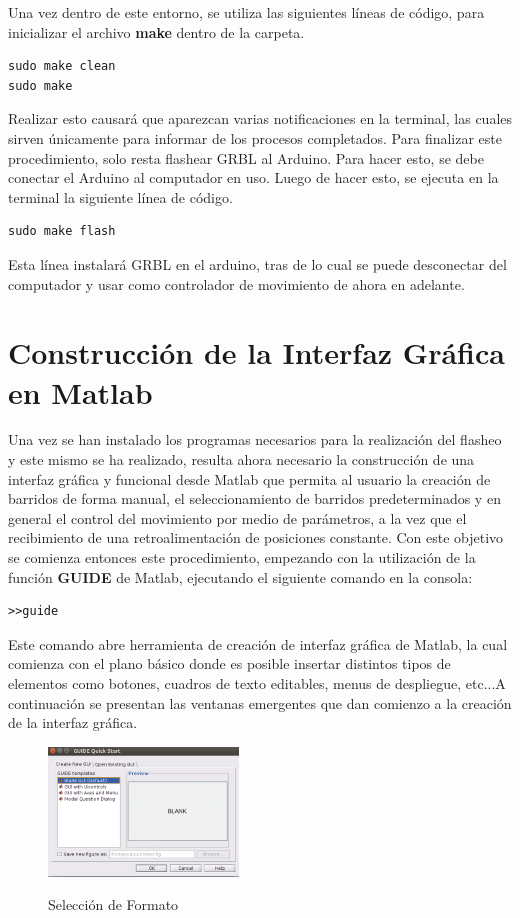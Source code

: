 \documentclass{article}
\begin{document}
\begin{multicols}{2}
\begin{enumerate}
Una vez dentro de este entorno, se utiliza las siguientes líneas de código, para inicializar el archivo \textbf{make} dentro de la carpeta.
\begin{lstlisting}
sudo make clean
sudo make
\end{lstlisting}
Realizar esto causará que aparezcan varias notificaciones en la terminal, las cuales sirven únicamente para informar de los procesos completados. Para finalizar este procedimiento, solo resta flashear GRBL al Arduino. Para hacer esto, se debe conectar el Arduino al computador en uso. Luego de hacer esto, se ejecuta en la terminal la siguiente línea de código.
\begin{lstlisting}
sudo make flash
\end{lstlisting}
Esta línea instalará GRBL en el arduino, tras de lo cual se puede desconectar del computador y usar como controlador de movimiento de ahora en adelante.
\end{enumerate}
{\centering \section{Construcción de la Interfaz Gráfica en Matlab}}
Una vez se han instalado los programas necesarios para la realización del flasheo y este mismo se ha realizado, resulta ahora necesario la construcción de una interfaz gráfica y funcional desde Matlab que permita al usuario la creación de barridos de forma manual, el seleccionamiento de barridos predeterminados y en general el control del movimiento por medio de parámetros, a la vez que el recibimiento de una retroalimentación de posiciones constante. Con este objetivo se comienza entonces este procedimiento, empezando con la utilización de la función \textbf{GUIDE} de Matlab, ejecutando el siguiente comando en la consola:
\begin{lstlisting}
>>guide
\end{lstlisting}
Este comando abre herramienta de creación de interfaz gráfica de Matlab, la cual comienza con el plano básico donde es posible insertar distintos tipos de elementos como botones, cuadros de texto editables, menus de despliegue, etc...A continuación se presentan las ventanas emergentes que dan comienzo a la creación de la interfaz gráfica.

\begin{figure}[H]
\centering
\includegraphics[width=0.45\textwidth]{GuideNuevo.png}
\label{fig:guide1}
\caption{Selección de Formato}
\end{figure}


\end{multicols}
\end{document}
